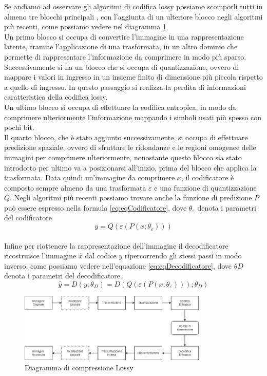 Se andiamo ad osservare gli algoritmi di codifica lossy possiamo scomporli tutti in almeno tre blocchi principali \cite{sadeeq2021image}, con l’aggiunta di un ulteriore blocco negli algoritmi più recenti, come possiamo vedere nel diagramma \ref{fig:LossyCompressorDiagram} \\
Un primo blocco si occupa di convertire l’immagine in una rappresentazione latente, tramite l’applicazione di una trasformata, in un altro dominio che permette di rappresentare l’informazione da comprimere in modo più sparso.\\
Successivamente si ha un blocco che si occupa di quantizzazione, ovvero di mappare i valori in ingresso in un insieme finito di dimensione più piccola rispetto a quello di ingresso. In questo passaggio si realizza la perdita di informazioni caratteristica della codifica lossy.\\
Un ultimo blocco si occupa di effettuare la codifica entropica, in modo da comprimere ulteriormente l’informazione mappando i simboli usati più spesso con pochi bit.\\
Il quarto blocco, che è stato aggiunto successivamente, si occupa di effettuare predizione spaziale, ovvero di sfruttare le ridondanze e le regioni omogenee delle immagini per comprimere ulteriormente, nonostante questo blocco sia stato introdotto per ultimo va a posizionarsi all’inizio, prima del blocco che applica la trasformata.
Data quindi un’immagine da comprimere $x$, il codificatore è composto sempre almeno da una trasformata  $\varepsilon$ e una funzione di quantizzazione $Q$. Negli algoritmi più recenti possiamo trovare anche la funzione di predizione $P$ può essere espresso nella formula \ref{eq:eqCodificatore}, dove $\theta_{\varepsilon}$ denota i parametri del codificatore
\begin{equation}\label{eq:eqCodificatore}
    y = Q(\varepsilon(P(x;\theta_{\varepsilon})))
\end{equation}\\
Infine per riottenere la rappresentazione dell’immagine il decodificatore ricostruisce l’immagine $\hat{x}$ dal codice $y$ ripercorrendo gli stessi passi in modo inverso, come possiamo vedere nell’equazione \ref{eq:eqDecodificatore}, dove $\theta{D}$ denota i parametri del decodificatore. \cite{hu2021learning}\\
\begin{equation}\label{eq:eqDecodificatore}
    \hat{y} = D(y;\theta_{D}) = D(Q(\varepsilon(P(x;\theta_{\varepsilon})));\theta_{D})
\end{equation}

\begin{figure}[t!]
    \centering
    \includegraphics[width=0.8\textwidth]{Immagini/LossyCompressorDiagram.png}
    \caption{Diagramma di compressione Lossy}
    \label{fig:LossyCompressorDiagram}
\end{figure}
